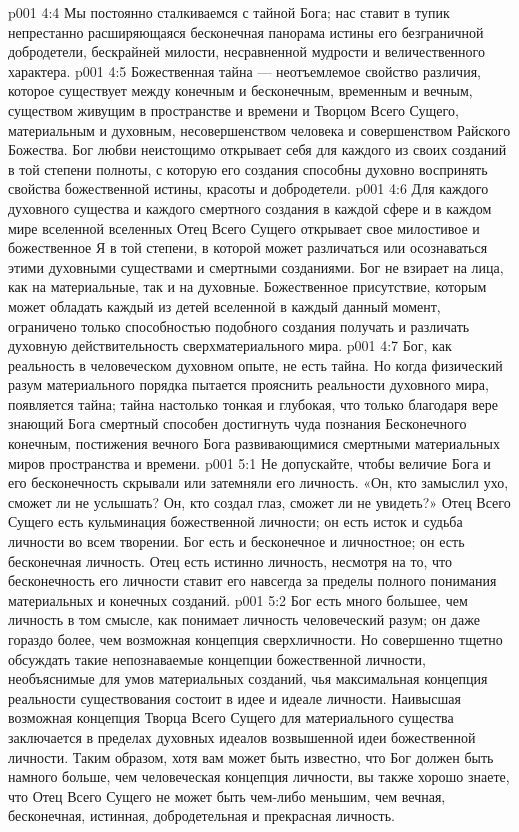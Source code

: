 \vs p001 4:4 \pc Мы постоянно сталкиваемся с тайной Бога; нас ставит в тупик непрестанно расширяющаяся бесконечная панорама истины его безграничной добродетели, бескрайней милости, несравненной мудрости и величественного характера.
\vs p001 4:5 \pc Божественная тайна --- неотъемлемое свойство различия, которое существует между конечным и бесконечным, временным и вечным, существом живущим в пространстве и времени и Творцом Всего Сущего, материальным и духовным, несовершенством человека и совершенством Райского Божества. Бог любви неистощимо открывает себя для каждого из своих созданий в той степени полноты, с которую его создания способны духовно воспринять свойства божественной истины, красоты и добродетели.
\vs p001 4:6 Для каждого духовного существа и каждого смертного создания в каждой сфере и в каждом мире вселенной вселенных Отец Всего Сущего открывает свое милостивое и божественное Я в той степени, в которой может различаться или осознаваться этими духовными существами и смертными созданиями. Бог не взирает на лица, как на материальные, так и на духовные. Божественное присутствие, которым может обладать каждый из детей вселенной в каждый данный момент, ограничено только способностью подобного создания получать и различать духовную действительность сверхматериального мира.
\vs p001 4:7 Бог, как реальность в человеческом духовном опыте, не есть тайна. Но когда физический разум материального порядка пытается прояснить реальности духовного мира, появляется тайна; тайна настолько тонкая и глубокая, что только благодаря вере знающий Бога смертный способен достигнуть чуда познания Бесконечного конечным, постижения вечного Бога развивающимися смертными материальных миров пространства и времени.
\vs p001 5:1 Не допускайте, чтобы величие Бога и его бесконечность скрывали или затемняли его личность. «Он, кто замыслил ухо, сможет ли не услышать? Он, кто создал глаз, сможет ли не увидеть?» Отец Всего Сущего есть кульминация божественной личности; он есть исток и судьба личности во всем творении. Бог есть и бесконечное и личностное; он есть бесконечная личность. Отец есть истинно личность, несмотря на то, что бесконечность его личности ставит его навсегда за пределы полного понимания материальных и конечных созданий.
\vs p001 5:2 Бог есть много большее, чем личность в том смысле, как понимает личность человеческий разум; он даже гораздо более, чем возможная концепция сверхличности. Но совершенно тщетно обсуждать такие непознаваемые концепции божественной личности, необъяснимые для умов материальных созданий, чья максимальная концепция реальности существования состоит в идее и идеале личности. Наивысшая возможная концепция Творца Всего Сущего для материального существа заключается в пределах духовных идеалов возвышенной идеи божественной личности. Таким образом, хотя вам может быть известно, что Бог должен быть намного больше, чем человеческая концепция личности, вы также хорошо знаете, что Отец Всего Сущего не может быть чем\hyp{}либо меньшим, чем вечная, бесконечная, истинная, добродетельная и прекрасная личность.
